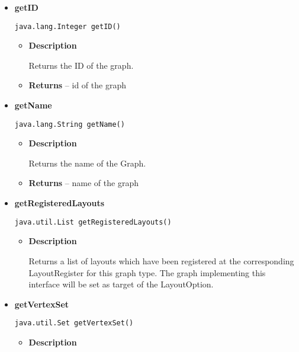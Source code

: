 {{{{{{{\begin{itemize}
{\begin{itemize}
{Get a set of all edges in this graph
}
\item{{\bf  Returns} -- 
 
}%
\end{itemize}
}%
\item{ 
{\bf  getID}\\
\begin{lstlisting}[frame=none]
java.lang.Integer getID()\end{lstlisting} %
\begin{itemize}
\item{
{\bf  Description}

Returns the ID of the graph.
}
\item{{\bf  Returns} -- 
id of the graph 
}%
\end{itemize}
}%
\item{ 
{\bf  getName}\\
\begin{lstlisting}[frame=none]
java.lang.String getName()\end{lstlisting} %
\begin{itemize}
\item{
{\bf  Description}

Returns the name of the Graph.
}
\item{{\bf  Returns} -- 
name of the graph 
}%
\end{itemize}
}%
\item{ 
{\bf  getRegisteredLayouts}\\
\begin{lstlisting}[frame=none]
java.util.List getRegisteredLayouts()\end{lstlisting} %
\begin{itemize}
\item{
{\bf  Description}

Returns a list of layouts which have been registered at the corresponding LayoutRegister for this graph type. The graph implementing this interface will be set as target of the LayoutOption.
}
\end{itemize}
}%
\item{ 
{\bf  getVertexSet}\\
\begin{lstlisting}[frame=none]
java.util.Set getVertexSet()\end{lstlisting} %
\begin{itemize}
\item{
{\bf  Description}

}
\end{itemize}}
\end{itemize}}}}}}}}
